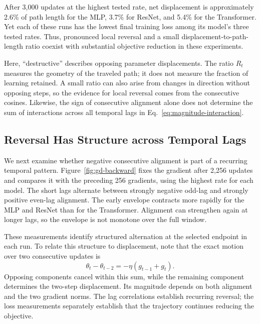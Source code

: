 After 3,000 updates at the highest tested rate, net displacement is
approximately 2.6\% of path length for the MLP, 3.7\% for ResNet, and
5.4\% for the Transformer. Yet each of these runs has the lowest final
training loss among its model's three tested rates. Thus, pronounced
local reversal and a small displacement-to-path-length ratio coexist
with substantial objective reduction in these experiments.

Here, ``destructive'' describes opposing parameter displacements.
The ratio $R_t$ measures the geometry of the traveled path; it does not
measure the fraction of learning retained. A small ratio can also arise
from changes in direction without opposing steps, so the evidence for
local reversal comes from the consecutive cosines. Likewise, the sign
of consecutive alignment alone does not determine the sum of interactions
across all temporal lags in Eq.~\eqref{eq:magnitude-interaction}.

\subsection{Reversal Has Structure across Temporal Lags}

We next examine whether negative consecutive alignment is part of a
recurring temporal pattern. Figure~\ref{fig:gd-backward} fixes the gradient
after 2,256 updates and compares it with the preceding 256 gradients,
using the highest rate for each model. The short lags alternate between
strongly negative odd-lag and strongly positive even-lag alignment.
The early envelope contracts more rapidly for the MLP and ResNet than
for the Transformer. Alignment can strengthen again at longer lags,
so the envelope is not monotone over the full window.

These measurements identify structured alternation at the selected
endpoint in each run. To relate this structure to displacement, note
that the exact motion over two consecutive updates is
\begin{equation}
  \theta_t-\theta_{t-2}=-\eta(g_{t-1}+g_t).
  \label{eq:gd-two-step-displacement}
\end{equation}
Opposing components cancel within this sum, while the remaining
component determines the two-step displacement. Its magnitude depends
on both alignment and the two gradient norms. The lag correlations
establish recurring reversal; the loss measurements separately
establish that the trajectory continues reducing the objective.

